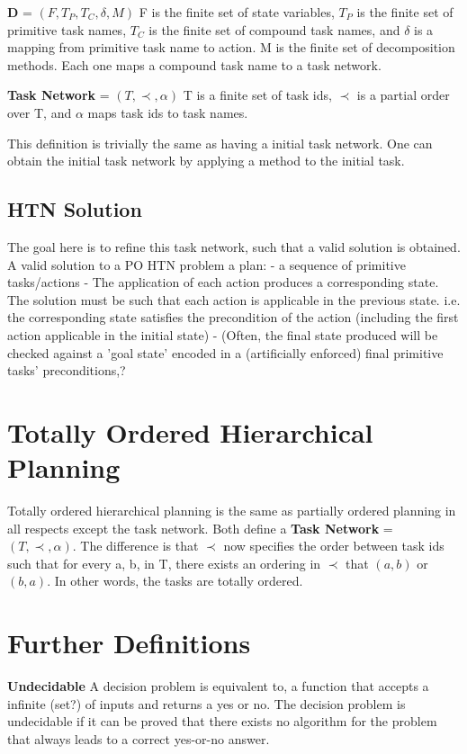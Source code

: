 \textbf{D} = $(F, T_P, T_C, \delta, M)$ \newline
   F is the finite set of state variables, $T_P$ is the finite set of primitive task names, $T_C$ is the finite set of compound task names, and
   $\delta$ is a mapping from primitive task name to action.
   M is the finite set of decomposition methods. Each one maps a compound task name to a task network.

\textbf{Task Network} = $(T, \prec, \alpha)$
 T is a finite set of task ids,
 $\prec$ is a partial order over T, and
 $\alpha$ maps task ids to task names.

This definition is trivially the same as having a initial task network. One can obtain the initial task network by applying a method to the initial task.

\subsection{HTN Solution}
The goal here is to refine this task network, such that a valid solution is obtained.
A valid solution to a PO HTN problem a plan:
   - a sequence of primitive tasks/actions
   - The application of each action produces a corresponding state. The solution must be such that each action is applicable
    in the previous state. i.e. the corresponding state satisfies the precondition of the action (including the first action applicable in the initial state)
   - (Often, the final state produced will be checked against a 'goal state' encoded in a (artificially enforced) final primitive tasks' preconditions,? 
     
     
\section{Totally Ordered Hierarchical Planning}
Totally ordered hierarchical planning is the same as partially ordered planning in all respects except the task network.
Both define a \textbf{Task Network} = $(T, \prec, \alpha)$.
The difference is that $\prec$ now specifies the order between task ids such that for every a, b, in T, there exists an ordering
in $\prec$ that $(a, b)$ or $(b, a)$.
In other words, the tasks are totally ordered. 


\section{Further Definitions}
\textbf{Undecidable } A decision problem is equivalent to, a function that accepts a infinite (set?) of inputs and returns a yes or no. The decision problem is undecidable if it can be proved that there exists no algorithm for the problem that always leads to a correct yes-or-no answer.


